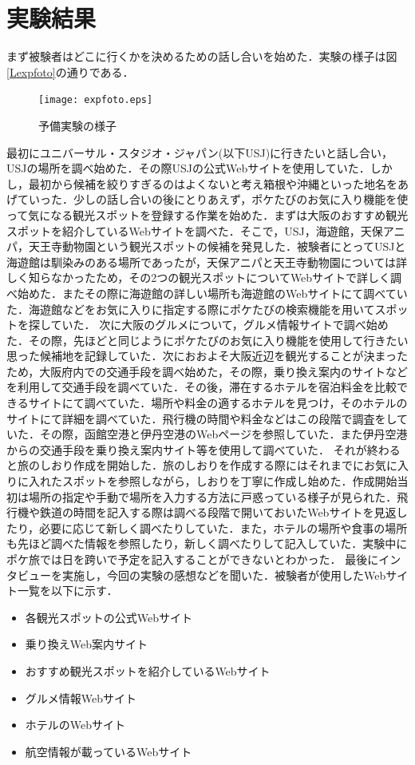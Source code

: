 \documentclass{funthesis}
\begin{document}
\section{実験結果}
まず被験者はどこに行くかを決めるための話し合いを始めた．実験の様子は図\ref{Lexpfoto}の通りである．

\begin{figure}[htpb]
\begin{center}
\texttt{[image: expfoto.eps]}
\end{center}
\caption{予備実験の様子}
\label{Lsepfoto}
\end{figure}


最初にユニバーサル・スタジオ・ジャパン(以下USJ)に行きたいと話し合い，USJの場所を調べ始めた．その際USJの公式Webサイトを使用していた．しかし，最初から候補を絞りすぎるのはよくないと考え箱根や沖縄といった地名をあげていった．少しの話し合いの後にとりあえず，ポケたびのお気に入り機能を使って気になる観光スポットを登録する作業を始めた．まずは大阪のおすすめ観光スポットを紹介しているWebサイトを調べた．そこで，USJ，海遊館，天保アニパ，天王寺動物園という観光スポットの候補を発見した．被験者にとってUSJと海遊館は馴染みのある場所であったが，天保アニパと天王寺動物園については詳しく知らなかったため，その2つの観光スポットについてWebサイトで詳しく調べ始めた．またその際に海遊館の詳しい場所も海遊館のWebサイトにて調べていた．海遊館などをお気に入りに指定する際にポケたびの検索機能を用いてスポットを探していた．
次に大阪のグルメについて，グルメ情報サイトで調べ始めた．その際，先ほどと同じようにポケたびのお気に入り機能を使用して行きたい思った候補地を記録していた．次におおよそ大阪近辺を観光することが決まったため，大阪府内での交通手段を調べ始めた，その際，乗り換え案内のサイトなどを利用して交通手段を調べていた．その後，滞在するホテルを宿泊料金を比較できるサイトにて調べていた．場所や料金の適するホテルを見つけ，そのホテルのサイトにて詳細を調べていた．飛行機の時間や料金などはこの段階で調査をしていた．その際，函館空港と伊丹空港のWebページを参照していた．また伊丹空港からの交通手段を乗り換え案内サイト等を使用して調べていた．
それが終わると旅のしおり作成を開始した．旅のしおりを作成する際にはそれまでにお気に入りに入れたスポットを参照しながら，しおりを丁寧に作成し始めた．作成開始当初は場所の指定や手動で場所を入力する方法に戸惑っている様子が見られた．飛行機や鉄道の時間を記入する際は調べる段階で開いておいたWebサイトを見返したり，必要に応じて新しく調べたりしていた．また，ホテルの場所や食事の場所も先ほど調べた情報を参照したり，新しく調べたりして記入していた．実験中にポケ旅では日を跨いで予定を記入することができないとわかった．
最後にインタビューを実施し，今回の実験の感想などを聞いた．被験者が使用したWebサイト一覧を以下に示す．
\begin{itemize}
 \item 各観光スポットの公式Webサイト
 \item 乗り換えWeb案内サイト
 \item おすすめ観光スポットを紹介しているWebサイト
 \item グルメ情報Webサイト
 \item ホテルのWebサイト
 \item 航空情報が載っているWebサイト
\end{itemize}
\end{document}
